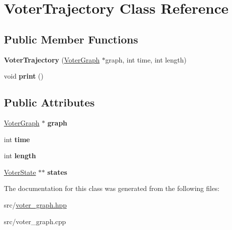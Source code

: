 \hypertarget{classVoterTrajectory}{\section{Voter\-Trajectory Class Reference}
\label{classVoterTrajectory}
}
\subsection*{Public Member Functions}
\begin{DoxyCompactItemize}
\item 
\hypertarget{classVoterTrajectory_aeed05c584f004a49264220c6d28a9bf6}{{\bfseries Voter\-Trajectory} (\hyperlink{classVoterGraph}{Voter\-Graph} $\ast$graph, int time, int length)}\label{classVoterTrajectory_aeed05c584f004a49264220c6d28a9bf6}

\item 
\hypertarget{classVoterTrajectory_a26679dac87b6f3659e6535cfab866254}{void {\bfseries print} ()}\label{classVoterTrajectory_a26679dac87b6f3659e6535cfab866254}

\end{DoxyCompactItemize}
\subsection*{Public Attributes}
\begin{DoxyCompactItemize}
\item 
\hypertarget{classVoterTrajectory_a650891344ead65411afe1568049f806b}{\hyperlink{classVoterGraph}{Voter\-Graph} $\ast$ {\bfseries graph}}\label{classVoterTrajectory_a650891344ead65411afe1568049f806b}

\item 
\hypertarget{classVoterTrajectory_a11c81f8457dd6bcffd4f757827f281d7}{int {\bfseries time}}\label{classVoterTrajectory_a11c81f8457dd6bcffd4f757827f281d7}

\item 
\hypertarget{classVoterTrajectory_aafa577619f3ae1d3de54cc8dd6d1636e}{int {\bfseries length}}\label{classVoterTrajectory_aafa577619f3ae1d3de54cc8dd6d1636e}

\item 
\hypertarget{classVoterTrajectory_a352892f77ab95ac223c7621e12e73b5e}{\hyperlink{classVoterState}{Voter\-State} $\ast$$\ast$ {\bfseries states}}\label{classVoterTrajectory_a352892f77ab95ac223c7621e12e73b5e}

\end{DoxyCompactItemize}


The documentation for this class was generated from the following files\-:\begin{DoxyCompactItemize}
\item 
src/\hyperlink{voter__graph_8hpp}{voter\-\_\-graph.\-hpp}\item 
src/voter\-\_\-graph.\-cpp\end{DoxyCompactItemize}
